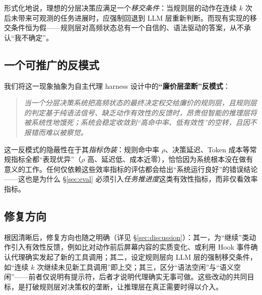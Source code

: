 形式化地说，理想的分层决策应满足一个\emph{移交条件}：当规则层的动作在连续 $k$ 次后未带来可观测的任务进展时，应强制回退到 LLM 层重新判断。而现有实现的移交条件恒为假——规则层对高频状态总有一个自信的、语法驱动的答案，从不承认“我不确定”。

\subsection{一个可推广的反模式}

我们将这一现象抽象为自主代理 harness 设计中的\textbf{“廉价层垄断”反模式}：

\begin{quote}\itshape
当一个分层决策系统把高频状态的最终决定权交给廉价的规则层，且规则层的判定基于纯语法信号、缺乏动作有效性的反馈时，昂贵但智能的推理层将被系统性地饿死；系统会稳定收敛到“高命中率、低有效性”的空转，且因不报错而难以被察觉。
\end{quote}

这一反模式的隐蔽性在于其\emph{指标伪装}：规则命中率 $\rho$、决策延迟、Token 成本等常规指标全都“表现优异”（$\rho$ 高、延迟低、成本近零），恰恰因为系统根本没在做有意义的工作。任何仅依赖这些效率指标的评估都会给出“系统运行良好”的错误结论——这也是为什么 \S\ref{sec:eval} 必须引入\emph{任务推进度}这类有效性指标，而非仅看效率指标。

\subsection{修复方向}

根因清晰后，修复方向也随之明确（详见 \S\ref{sec:discussion}）：其一，为“继续”类动作引入有效性反馈，例如比对动作前后屏幕内容的实质变化、或利用 Hook 事件确认代理确实发起了新的工具调用；其二，设定规则层向 LLM 层的强制移交条件，如“连续 $k$ 次继续未见新工具调用”即上交；其三，区分“语法空闲”与“语义空闲”——前者仅说明有提示符，后者才说明代理确实无事可做。这些改动的共同目标，是打破规则层对决策权的垄断，让推理层在真正需要时得以介入。
